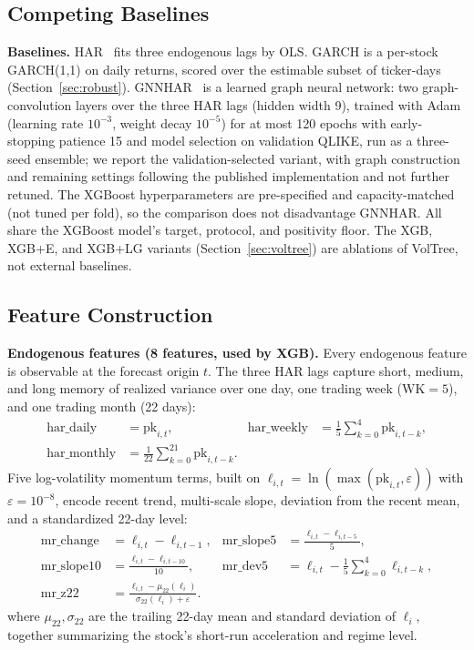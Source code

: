 \documentclass[runningheads,a4paper]{llncs}
\begin{document}
\subsection{Competing Baselines}
\textbf{Baselines.} HAR~\cite{corsi2009} fits three endogenous lags by OLS. GARCH is a per-stock
GARCH(1,1) on daily returns, scored over the estimable subset of ticker-days (Section~\ref{sec:robust}).
GNNHAR~\cite{gnnhar2024} is a learned graph neural network: two graph-convolution layers over the three
HAR lags (hidden width 9), trained with Adam (learning rate $10^{-3}$, weight decay $10^{-5}$) for at most
120 epochs with early-stopping patience 15 and model selection on validation QLIKE, run as a three-seed
ensemble; we report the validation-selected variant, with graph construction and remaining settings
following the published implementation and not further retuned. The XGBoost hyperparameters are
pre-specified and capacity-matched (not tuned per fold), so the comparison does not disadvantage GNNHAR. All
share the XGBoost model's target, protocol, and positivity floor. The XGB, XGB+E, and XGB+LG variants (Section~\ref{sec:voltree}) are ablations of VolTree, not
external baselines.

\subsection{Feature Construction}
\textbf{Endogenous features (8 features, used by XGB).} Every endogenous feature is observable at the
forecast origin $t$. The three HAR lags capture short, medium, and long memory of realized variance
over one day, one trading week ($\mathrm{WK}=5$), and one trading month (22 days):
\begin{align}
\mathrm{har\_daily} &= \mathrm{pk}_{i,t}, &
\mathrm{har\_weekly} &= \frac{1}{5}\sum_{k=0}^{4}\mathrm{pk}_{i,t-k},\\
\mathrm{har\_monthly} &= \frac{1}{22}\sum_{k=0}^{21}\mathrm{pk}_{i,t-k}. &&
\end{align}
Five log-volatility momentum terms, built on $\ell_{i,t}=\ln(\max(\mathrm{pk}_{i,t},\varepsilon))$ with
$\varepsilon=10^{-8}$, encode recent trend, multi-scale slope, deviation from the recent mean, and a
standardized 22-day level:
\begin{align}
\mathrm{mr\_change} &= \ell_{i,t}-\ell_{i,t-1}, &
\mathrm{mr\_slope5} &= \frac{\ell_{i,t}-\ell_{i,t-5}}{5},\\
\mathrm{mr\_slope10} &= \frac{\ell_{i,t}-\ell_{i,t-10}}{10}, &
\mathrm{mr\_dev5} &= \ell_{i,t}-\frac{1}{5}\sum_{k=0}^{4}\ell_{i,t-k},\\
\mathrm{mr\_z22} &= \frac{\ell_{i,t}-\mu_{22}(\ell_i)}{\sigma_{22}(\ell_i)+\varepsilon}. &&
\end{align}
where $\mu_{22},\sigma_{22}$ are the trailing 22-day mean and standard deviation of $\ell_i$, together
summarizing the stock's short-run acceleration and regime level.
\end{document}
